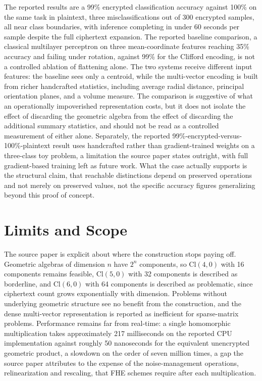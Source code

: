 The reported results are a 99\% encrypted classification accuracy against 100\% on the same task in plaintext, three misclassifications out of 300 encrypted samples, all near class boundaries, with inference completing in under 60 seconds per sample despite the full ciphertext expansion. The reported baseline comparison, a classical multilayer perceptron on three mean-coordinate features reaching 35\% accuracy and failing under rotation, against 99\% for the Clifford encoding, is not a controlled ablation of flattening alone. The two systems receive different input features: the baseline sees only a centroid, while the multi-vector encoding is built from richer handcrafted statistics, including average radial distance, principal orientation planes, and a volume measure. The comparison is suggestive of what an operationally impoverished representation costs, but it does not isolate the effect of discarding the geometric algebra from the effect of discarding the additional summary statistics, and should not be read as a controlled measurement of either alone. Separately, the reported 99\%-encrypted-versus-100\%-plaintext result uses handcrafted rather than gradient-trained weights on a three-class toy problem, a limitation the source paper states outright, with full gradient-based training left as future work. What the case actually supports is the structural claim, that reachable distinctions depend on preserved operations and not merely on preserved values, not the specific accuracy figures generalizing beyond this proof of concept.

\section{Limits and Scope}

The source paper is explicit about where the construction stops paying off. Geometric algebras of dimension $n$ have $2^n$ components, so $\mathrm{Cl}(4,0)$ with 16 components remains feasible, $\mathrm{Cl}(5,0)$ with 32 components is described as borderline, and $\mathrm{Cl}(6,0)$ with 64 components is described as problematic, since ciphertext count grows exponentially with dimension. Problems without underlying geometric structure see no benefit from the construction, and the dense multi-vector representation is reported as inefficient for sparse-matrix problems. Performance remains far from real-time: a single homomorphic multiplication takes approximately 217 milliseconds on the reported CPU implementation against roughly 50 nanoseconds for the equivalent unencrypted geometric product, a slowdown on the order of seven million times, a gap the source paper attributes to the expense of the noise-management operations, relinearization and rescaling, that FHE schemes require after each multiplication.

